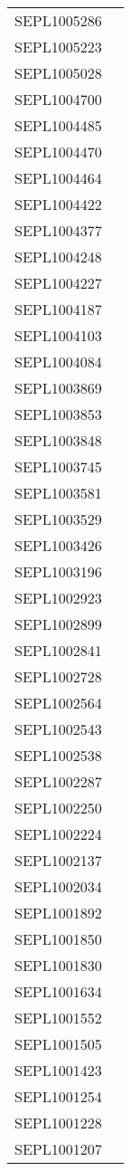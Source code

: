 \documentclass[a4paper]{report}
\begin{document}
\begin{longtable}{| p{4cm} | p{10cm} |}
	SEPL1005286  &  \\
	SEPL1005223  &  \\
	SEPL1005028  &  \\
	SEPL1004700  &  \\
	SEPL1004485  &  \\
	SEPL1004470  &  \\
	SEPL1004464  &  \\
	SEPL1004422  &  \\
	SEPL1004377  &  \\
	SEPL1004248  &  \\
	SEPL1004227  &  \\
	SEPL1004187  &  \\
	SEPL1004103  &  \\
	SEPL1004084  &  \\
	SEPL1003869  &  \\
	SEPL1003853  &  \\
	SEPL1003848  &  \\
	SEPL1003745  &  \\
	SEPL1003581  &  \\
	SEPL1003529  &  \\
	SEPL1003426  &  \\
	SEPL1003196  &  \\
	SEPL1002923  &  \\
	SEPL1002899  &  \\
	SEPL1002841  &  \\
	SEPL1002728  &  \\
	SEPL1002564  &  \\
	SEPL1002543  &  \\
	SEPL1002538  &  \\
	SEPL1002287  &  \\
	SEPL1002250  &  \\
	SEPL1002224  &  \\
	SEPL1002137  &  \\
	SEPL1002034  &  \\
	SEPL1001892  &  \\
	SEPL1001850  &  \\
	SEPL1001830  &  \\
	SEPL1001634  &  \\
	SEPL1001552  &  \\
	SEPL1001505  &  \\
	SEPL1001423  &  \\
	SEPL1001254  &  \\
	SEPL1001228  &  \\
	SEPL1001207  &  \\

\end{longtable}
\end{document}

